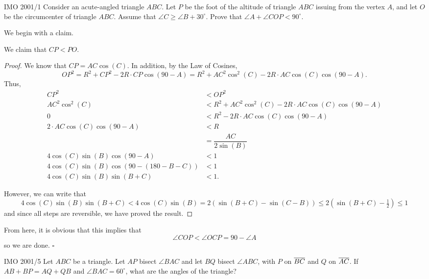 \documentclass{article}
\begin{document}
\begin{problem}[5.28]{IMO 2001/1}
Consider an acute-angled triangle $ABC$. Let $P$ be the foot of the altitude of triangle $ABC$ issuing from the vertex $A$, and let $O$ be the circumcenter of triangle $ABC$. Assume that $\angle C \ge \angle B + 30^\circ$. Prove that $\angle A + \angle COP < 90^\circ$.
\end{problem}

We begin with a claim.
\begin{claim*}
We claim that $CP < PO$.
\end{claim*}
\begin{proof}
We know that $CP = AC\cos(C)$. In addition, by the Law of Cosines, \[OP^2 = R^2+CP^2-2R\cdot CP\cos(90-A) = R^2+AC^2\cos^2(C)-2R\cdot AC\cos(C)\cos(90-A).\] Thus,
\begin{align*}
CP^2 &< OP^2 \\
AC^2\cos^2(C) &< R^2+AC^2\cos^2(C)-2R\cdot AC\cos(C)\cos(90-A) \\
0 &< R^2-2R\cdot AC\cos(C)\cos(90-A) \\
2\cdot AC\cos(C)\cos(90-A) &< R \\
&= \dfrac{AC}{2\sin(B)} \\
4\cos(C)\sin(B)\cos(90-A) &< 1 \\
4\cos(C)\sin(B)\cos(90-(180-B-C)) &< 1 \\
4\cos(C)\sin(B)\sin(B+C) &< 1.
\end{align*}

However, we can write that \[4\cos(C)\sin(B)\sin(B+C) < 4\cos(C)\sin(B) = 2(\sin(B+C)-\sin(C-B)) \le 2(\sin(B+C)-\tfrac{1}{2}) \le 1\] and since all steps are reversible, we have proved the result.
\end{proof}

From here, it is obvious that this implies that \[\angle COP < \angle OCP = 90-\angle A\] so we are done. $\square$

\begin{problem}[5.29]{IMO 2001/5}
Let $ABC$ be a triangle. Let $AP$ bisect $\angle BAC$ and let $BQ$ bisect $\angle ABC$, with $P$ on $\overline{BC}$ and $Q$ on $\overline{AC}$. If $AB + BP = AQ + QB$ and $\angle BAC = 60^\circ$, what are the angles of the triangle?
\end{problem}
\end{document}
